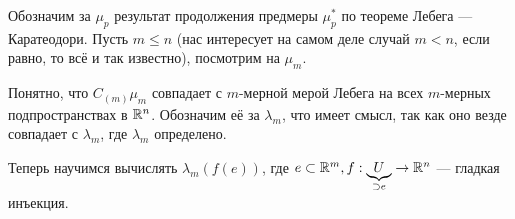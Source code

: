 \documentclass[a4paper]{report}
\begin{document}
    Обозначим за $\mu_p$ результат продолжения предмеры $\mu_p^*$ по теореме Лебега --- Каратеодори.
    Пусть $m \le n$ (нас интересует на самом деле случай $m < n$, если равно, то всё и так известно), посмотрим на $\mu_m$.

    Понятно, что $C_{(m)}\mu_m$ совпадает с $m$-мерной мерой Лебега на всех $m$-мерных подпространствах в $\mathbb{R}^n$.
    Обозначим её за $\lambda_m$, что имеет смысл, так как оно везде совпадает с $\lambda_m$, где $\lambda_m$ определено.

    Теперь научимся вычислять $\lambda_m(f(e))$, где $e \subset \mathbb{R}^m, f: \underbrace{U}_{\supset e} \rightarrow \mathbb{R}^n$ --- гладкая инъекция.
\end{document}
